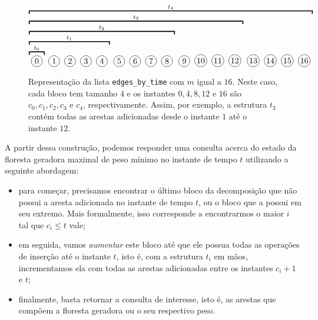 \begin{figure}
    \centering
    \begin{equation*}
        \overbracket{
            \overbracket{
                \overbracket{
                    \overbracket{
                        \overbracket{
                            \bolinha{\,0\,}
                        }^{t_0}
                        \bolinha{\,1\,}
                        \bolinha{\,2\,}
                        \bolinha{\,3\,}
                        \bolinha{\,4\,}
                    }^{t_1}
                    \bolinha{\,5\,}
                    \bolinha{\,6\,}
                    \bolinha{\,7\,}
                    \bolinha{\,8\,}
                }^{t_2}
                \bolinha{\,9\,}
                \bolinha{10}
                \bolinha{11}
                \bolinha{12}
            }^{t_3}
            \bolinha{13}
            \bolinha{14}
            \bolinha{15}
            \bolinha{16}
        }^{t_4}
    \end{equation*}
    \caption{Representação da lista \texttt{edges\_by\_time} com $m$ igual a $16$. Neste caso, cada bloco tem tamanho $4$ e os instantes $0,4,8,12$ e $16$ são $c_0, c_1, c_2, c_3$ e $c_4$, respectivamente. Assim, por exemplo, a estrutura $t_3$ contém todas as arestas adicionadas desde o instante $1$ até o instante $12$.}
    \label{fig:sqrt-decomp-blocks-m16}
\end{figure}

A partir dessa construção, podemos responder uma consulta acerca do estado da floresta geradora maximal de peso mínimo no instante de tempo $t$ utilizando a seguinte abordagem:

\begin{itemize}
    \item para começar, precisamos encontrar o último bloco da decomposição que não possui a aresta adicionada no instante de tempo $t$, ou o bloco que a possui em seu extremo. Mais formalmente, isso corresponde a encontrarmos o maior $i$ tal que $c_i \leq t$ vale;
    \item em seguida, vamos \emph{aumentar} este bloco até que ele possua todas as operações de inserção até o instante $t$, isto é, com a estrutura $t_i$ em mãos, incrementamos ela com todas as arestas adicionadas entre os instantes $c_i + 1$ e $t$;
    \item finalmente, basta retornar a consulta de interesse, isto é, as arestas que compõem a floresta geradora ou o seu respectivo peso.
\end{itemize}

